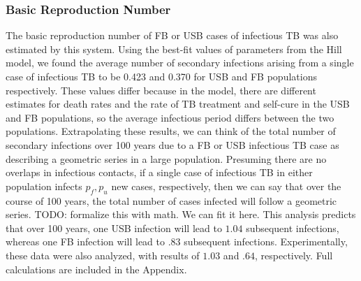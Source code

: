 \documentclass{amsart}
\begin{document}
\subsubsection{Basic Reproduction Number}
The basic reproduction number of FB or USB cases of infectious TB was also
estimated by this system. Using the best-fit values of parameters from the 
Hill model, we found the average number of secondary infections arising from
a single case of infectious TB to be 0.423 and 0.370 for USB and FB populations
respectively.  These values differ because in the model, there are different
estimates for death rates and the rate of TB treatment and self-cure in the USB and FB populations, 
so the average infectious period differs between the two populations.
Extrapolating these results, we can think of the
total number of secondary infections over 100 years due to a FB or USB
infectious TB case as describing a geometric series in a large population.
Presuming there are no overlaps in infectious contacts, if a single case of
infectious TB in either population infects $p_f, p_u$ new cases,
respectively, then we can say that over the course of 100 years, the total
number of cases infected will follow a geometric series.
{\huge \color{red} TODO: formalize this with math. We can fit it here.}
This analysis predicts
that over 100 years, one USB infection will lead to $1.04$ subsequent infections,
whereas one FB infection will lead to $.83$ subsequent infections. Experimentally, 
these data were also analyzed, with results of $1.03$ and $.64$, respectively. 
Full calculations are included in the Appendix.  
\end{document}
